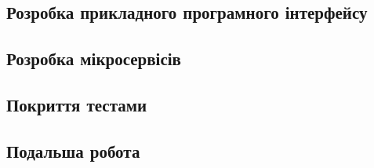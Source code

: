\documentclass[a4paper,14pt]{extarticle} %
\begin{document}
\subsection{Розробка прикладного програмного інтерфейсу} 





\subsection{Розробка мікросервісів} 



\subsection{Покриття тестами}




\subsection{Подальша робота}


\end{document}
